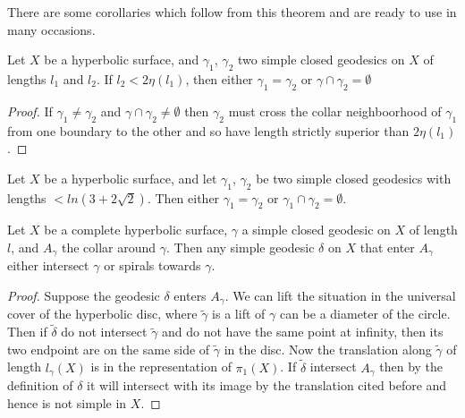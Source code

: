 There are some corollaries which follow from this theorem and are ready to use in many occasions.

\begin{cor}
Let $X$ be a hyperbolic surface, and $\gamma_1$, $\gamma_2$ two simple closed geodesics on $X$ of lengths $l_1$ and $l_2$. If $l_2 < 2 \eta(l_1)$, then either $\gamma_1=\gamma_2$ or $\gamma \cap \gamma_2 = \emptyset$
\end{cor}

\begin{proof}
If $\gamma_1 \neq \gamma_2$ and $\gamma \cap \gamma_2 \neq \emptyset$ then $\gamma_2$ must cross the collar neighboorhood of $\gamma_1$ from one boundary to the other and so have length strictly superior than $2 \eta(l_1)$.
\end{proof}

\begin{cor}
Let $X$ be a hyperbolic surface, and let $\gamma_1$, $\gamma_2$ be two simple closed geodesics with lengths $< ln(3+2 \sqrt{2})$. Then either $\gamma_1=\gamma_2$ or $\gamma_1 \cap \gamma_2 = \emptyset$.
\end{cor}

\begin{cor}
Let $X$ be a complete hyperbolic surface, $\gamma$ a simple closed geodesic on $X$ of length $l$, and $A_{\gamma}$ the collar around $\gamma$. Then any simple geodesic $\delta$ on $X$ that enter $A_{\gamma}$ either intersect $\gamma$ or spirals towards $\gamma$.
\end{cor}

\begin{proof}
Suppose the geodesic $\delta$ enters $A_{\gamma}$. We can lift the situation in the universal cover of the hyperbolic disc, where $\tilde{\gamma}$ is a lift of $\gamma$ can be a diameter of the circle. Then if $\tilde{\delta}$ do not intersect $\tilde{\gamma}$
and do not have the same point at infinity, then its two endpoint are on the same side of $\tilde{\gamma}$ in the disc. Now the translation along $\tilde{\gamma}$ of length $l_{\gamma}(X)$ is in the representation of $\pi_1(X)$.
If $\tilde{\delta}$ intersect $A_{\gamma}$ then by the definition of $\delta$ it will intersect with its image by the translation cited before and hence is not simple in $X$.
\end{proof}
